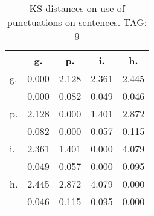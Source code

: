 \begin{table}[h!]
\begin{center}
\begin{tabular}{| l | c | c | c | c |}\hline
 & g. & p. & i. & h. \\\hline
g. & 0.000  & 2.128  & 2.361  & 2.445 \\\hline
 & 0.000  & 0.082  & 0.049  & 0.046 \\\hline
p. & 2.128  & 0.000  & 1.401  & 2.872 \\\hline
 & 0.082  & 0.000  & 0.057  & 0.115 \\\hline
i. & 2.361  & 1.401  & 0.000  & 4.079 \\\hline
 & 0.049  & 0.057  & 0.000  & 0.095 \\\hline
h. & 2.445  & 2.872  & 4.079  & 0.000 \\\hline
 & 0.046  & 0.115  & 0.095  & 0.000 \\\hline
\end{tabular}
\caption{KS distances on use of punctuations on sentences. TAG: 9}
\end{center}
\end{table}